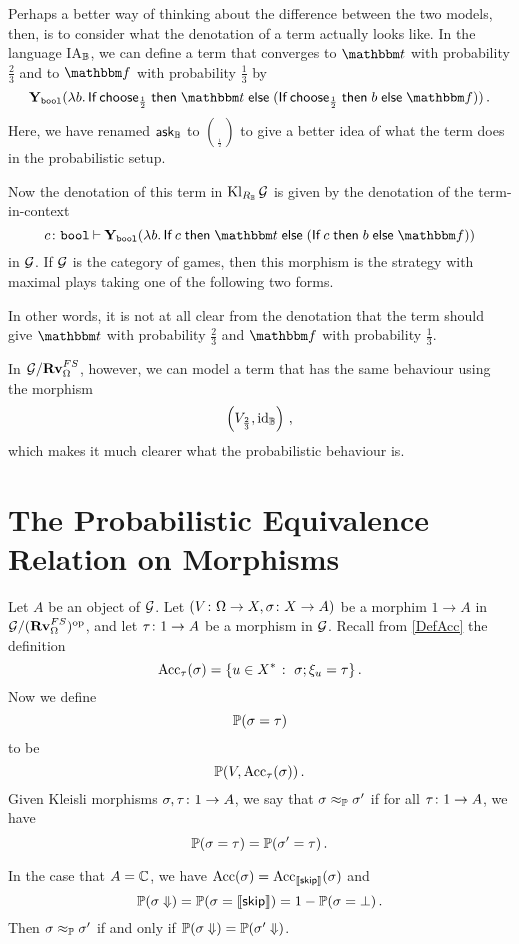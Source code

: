 \documentclass{report}[11pt]
\begin{document}
Perhaps a better way of thinking about the difference between the two models, then, is to consider what the denotation of a term actually looks like.  
In the language IA${}_{\mathbb{B}}$, we can define a term that converges to $\true$ with probability $\frac23$ and to $\false$ with probability $\frac13$ by
\[
  \Y_\bool(\lambda b.\If \choose_{\frac12} \Then \true \Else (\If \choose_{\frac12} \Then b \Else \false))\,.
  \]
Here, we have renamed $\operatorname{{\mathsf{ask}}}_{\mathbb{B}}$ to $\choose_{\frac12}$ to give a better idea of what the term does in the probabilistic setup.

Now the denotation of this term in $\operatorname{Kl}_{R_{\mathbb{B}}}\mathcal G$ is given by the denotation of the term-in-context
\[
  c\from\bool\ts\Y_{\bool}(\lambda b.\If c \Then \true \Else (\If c \Then b \Else \false))
  \]
in $\mathcal G$.
If $\mathcal G$ is the category of games, then this morphism is the strategy with maximal plays taking one of the following two forms.
In other words, it is not at all clear from the denotation that the term should give $\true$ with probability $\frac23$ and $\false$ with probability $\frac13$.

In $\mathcal G/{\normalfont\textbf{Rv}}_{\Omega}^{FS}$, however, we can model a term that has the same behaviour using the morphism
\[
  \left(V_{\frac23}, \operatorname{id}_{\mathbb{B}}\right)\,,
  \]
which makes it much clearer what the probabilistic behaviour is.

\section{The Probabilistic Equivalence Relation on Morphisms}

\begin{definition}
  Let $A$ be an object of $\mathcal G$.  
  Let $(V\colon\Omega \to X,\sigma\colon X \to A)$ be a morphim $1\to A$ in $\mathcal G/({\normalfont\textbf{Rv}}_{\Omega}^{FS})^{\mathrm{op}}$, and let $\tau \colon 1 \to A$ be a morphism in $\mathcal G$.  
  Recall from \ref{DefAcc} the definition
  \[
    \operatorname{Acc}_\tau(\sigma) = \{u\in X^* \;\colon\; \sigma;\xi_u = \tau\}\,.
    \]
  Now we define
  \[
    \mathbb{P}(\sigma = \tau)
    \]
  to be
  \[
    \mathbb{P}(V,\operatorname{Acc}_\tau(\sigma))\,.
    \]
  Given Kleisli morphisms $\sigma,\tau\colon 1 \to A$, we say that $\sigma\approx_{\mathbb{P}}\sigma'$ if for all $\tau\colon 1 \to A$, we have
  \[
    \mathbb{P}(\sigma = \tau) = \mathbb{P}(\sigma' = \tau)\,.
    \]
  \label{DefProbEquiv}
\end{definition}
\begin{remark}
  In the case that $A=\mathbb{C}$, we have $\operatorname{Acc}(\sigma) = \operatorname{Acc}_{\left\llbracket{\mathsf{skip}}\right\rrbracket}(\sigma)$ and
  \[
    \mathbb{P}(\sigma\Downarrow) = \mathbb{P}(\sigma = \left\llbracket{\mathsf{skip}}\right\rrbracket) = 1 - \mathbb{P}(\sigma = \bot)\,.
    \]
  Then $\sigma\approx_{\mathbb{P}}\sigma'$ if and only if $\mathbb{P}(\sigma\Downarrow)=\mathbb{P}(\sigma'\Downarrow)$.
\end{remark}
\end{document}
